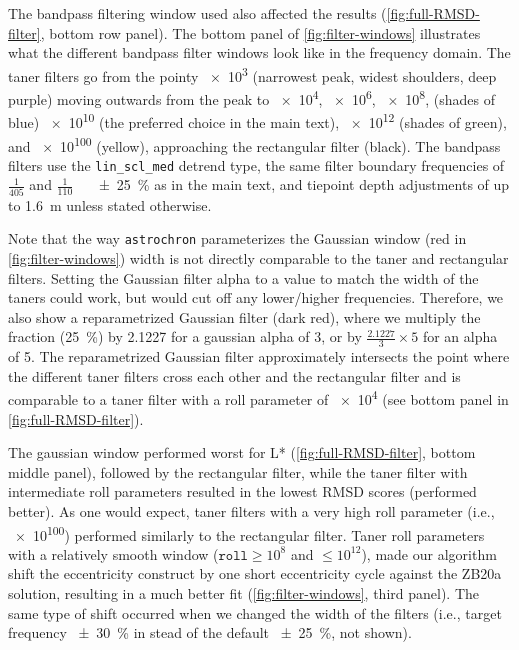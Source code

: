 \documentclass[draft]{agujournal2019}
\begin{document}
The bandpass filtering window used also affected the results (\cref{fig:full-RMSD-filter}, bottom row panel).
The bottom panel of \cref{fig:filter-windows} illustrates what the different bandpass filter windows look like in the frequency domain.
The taner filters go from the pointy \num{e3} (narrowest peak, widest shoulders, deep purple)
moving outwards from the peak to \num{e4}, \num{e6}, \num{e8}, (shades of blue)
\num{e10} (the preferred choice in the main text),
\num{e12} (shades of green), and \num{e100} (yellow),
approaching the rectangular filter (black).
The bandpass filters use the \texttt{lin\_scl\_med} detrend type,
the same filter boundary frequencies of \(\frac{1}{405}\) and \(\frac{1}{110}\)~\si[per-mode=power]{\per\kiloyear} \qty{\pm25}{\percent} as in the main text,
and tiepoint depth adjustments of up to \qty{1.6}{\metre} unless stated otherwise.

Note that the way \texttt{astrochron} parameterizes the Gaussian window (red in \cref{fig:filter-windows}) width is not directly comparable to the taner and rectangular filters.
Setting the Gaussian filter alpha to a value to match the width of the taners could work, but would cut off any lower/higher frequencies.
Therefore, we also show a reparametrized Gaussian filter (dark red),
where we multiply the fraction (\qty{25}{\percent})
by \num{2.1227} for a gaussian alpha of 3,
or by \(\frac{2.1227}{3}\times5\) for an alpha of 5.
The reparametrized Gaussian filter approximately intersects the point where the different taner filters cross each other and the rectangular filter and is comparable to a taner filter with a roll parameter of \num{e4} (see bottom panel in \cref{fig:full-RMSD-filter}).

The gaussian window performed worst for \gls{L*} (\cref{fig:full-RMSD-filter}, bottom middle panel),
followed by the rectangular filter,
while the taner filter with intermediate roll parameters resulted in the lowest \gls{RMSD} scores (performed better).
As one would expect, taner filters with a very high roll parameter (i.e., \num{e100}) performed similarly to the rectangular filter.
Taner roll parameters with a relatively smooth window (\(\texttt{roll} \ge 10^{8}\) and \(\le 10^{12}\)), made our algorithm shift the eccentricity construct by one short eccentricity cycle against the ZB20a solution, resulting in a much better fit (\cref{fig:filter-windows}, third panel).
The same type of shift occurred when we changed the width of the filters (i.e., target frequency \qty{\pm30}{\percent} in stead of the default \qty{\pm25}{\percent}, not shown).
\end{document}
